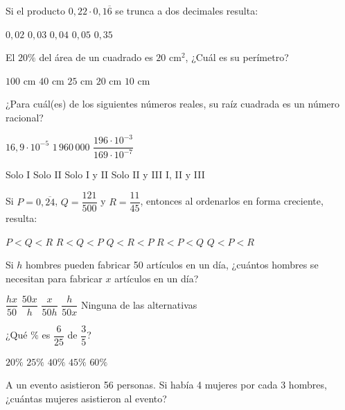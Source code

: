 \documentclass[revolver]{srs}
\begin{document}
\begin{preguntas}[after-item-skip=2cm]
\pregunta Si el producto $0,22 \cdot 0,1\overline{6}$ se trunca a dos decimales resulta:
\begin{vertical}
\alternativa $0,02$
\alternativa $0,03$
\alternativa $0,04$
\alternativa $0,05$
\alternativa $0,35$
\end{vertical}

\pregunta El $20\%$ del área de un cuadrado es $20 \text{ cm}^2$, ¿Cuál es su perímetro?
\begin{vertical}
\alternativa $100 \text{ cm}$
\alternativa $40 \text{ cm}$
\alternativa $25 \text{ cm}$
\alternativa $20 \text{ cm}$
\alternativa $10 \text{ cm}$
\end{vertical}

\pregunta ¿Para cuál(es) de los siguientes números reales, su raíz cuadrada es un número racional?
\begin{verticali}
\alternativa $16,9 \cdot 10^{-5}$
\alternativa $1\,960\,000$
\alternativa $\dfrac{196 \cdot 10^{-3}}{169 \cdot 10^{-7}}$
\end{verticali}
\begin{vertical}
\alternativa Solo I
\alternativa Solo II
\alternativa Solo I y II
\alternativa Solo II y III
\alternativa I, II y III
\end{vertical}

\pregunta Si $P = 0,\overline{24}$, $Q = \dfrac{121}{500}$ y $R = \dfrac{11}{45}$, entonces al ordenarlos en forma creciente, resulta:
\begin{vertical}
\alternativa $P < Q < R$
\alternativa $R < Q < P$
\alternativa $Q < R < P$
\alternativa $R < P < Q$
\alternativa $Q < P < R$
\end{vertical}

\pregunta Si $h$ hombres pueden fabricar 50 artículos en un día, ¿cuántos hombres se necesitan para fabricar $x$ artículos en un día?
\begin{vertical}
\alternativa $\dfrac{hx}{50}$
\alternativa $\dfrac{50x}{h}$
\alternativa $\dfrac{x}{50h}$
\alternativa $\dfrac{h}{50x}$
\alternativa Ninguna de las alternativas
\end{vertical}

\pregunta ¿Qué $\%$ es $\dfrac{6}{25}$ de $\dfrac{3}{5}$?
\begin{vertical}
\alternativa $20\%$
\alternativa $25\%$
\alternativa $40\%$
\alternativa $45\%$
\alternativa $60\%$
\end{vertical}

\pregunta A un evento asistieron 56 personas. Si había 4 mujeres por cada 3 hombres, ¿cuántas mujeres asistieron al evento?
\begin{vertical}
\end{vertical}


\end{preguntas}
\end{document}
